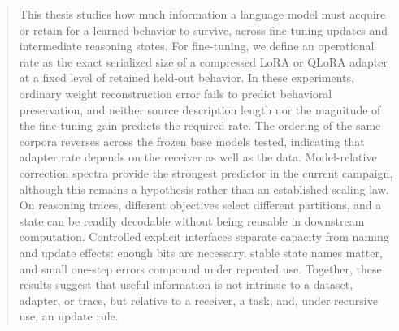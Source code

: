 \begin{abstract}

This thesis studies how much information a language model must acquire or retain for a learned behavior to survive, across fine-tuning updates and intermediate reasoning states. For fine-tuning, we define an operational rate as the exact serialized size of a compressed LoRA or QLoRA adapter at a fixed level of retained held-out behavior. In these experiments, ordinary weight reconstruction error fails to predict behavioral preservation, and neither source description length nor the magnitude of the fine-tuning gain predicts the required rate. The ordering of the same corpora reverses across the frozen base models tested, indicating that adapter rate depends on the receiver as well as the data. Model-relative correction spectra provide the strongest predictor in the current campaign, although this remains a hypothesis rather than an established scaling law. On reasoning traces, different objectives select different partitions, and a state can be readily decodable without being reusable in downstream computation. Controlled explicit interfaces separate capacity from naming and update effects: enough bits are necessary, stable state names matter, and small one-step errors compound under repeated use. Together, these results suggest that useful information is not intrinsic to a dataset, adapter, or trace, but relative to a receiver, a task, and, under recursive use, an update rule.

\end{abstract}
